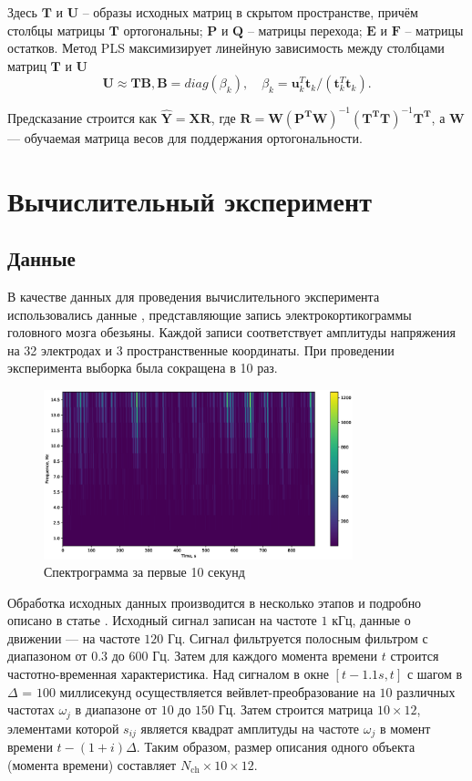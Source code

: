 \documentclass[12pt, twoside]{article}
\begin{document}
Здесь $\mathbf{T}$ и $\mathbf{U}$ – образы исходных матриц в скрытом пространстве, причём столбцы матрицы
$\mathbf{T}$ ортогональны; $\mathbf{P}$ и $\mathbf{Q}$ – матрицы перехода; $\mathbf{E}$ и $\mathbf{F}$ – матрицы остатков. Метод PLS
максимизирует линейную зависимость между столбцами матриц $\mathbf{T}$ и $\mathbf{U}$
\[\mathbf{U} \approx \mathbf{TB}, \mathbf{B} = diag(\beta_k), \quad \beta_k = \mathbf{u}^T_k 
\mathbf{t}_k/(\mathbf{t}^T_k\mathbf{
t}_k).
\]

Предсказание строится как $\hat{\mathbf{Y}} = \mathbf{XR}$, где $\mathbf{R} = \mathbf{W(P^TW)}^{-1}\mathbf{(T^TT)}^{-1}\mathbf{T^T}$, а $\mathbf{W}$ --- обучаемая матрица весов для поддержания ортогональности.
\section{Вычислительный эксперимент}
\subsection{Данные}
В качестве данных для проведения вычислительного эксперимента использовались данные \cite{chao2010long}, представляющие запись электрокортикограммы головного мозга обезьяны. Каждой записи соответствует амплитуды напряжения на 32 электродах и 3 пространственные координаты.
При проведении эксперимента выборка была сокращена в 10 раз.

\begin{figure}[h!]
	\centering
	\includegraphics[width=0.8\textwidth]{../figs/spectrogram.eps}
	\caption{Спектрограмма за первые 10 секунд}
\end{figure}
Обработка исходных данных производится в несколько этапов и подробно описано в статье \cite{zhao2010ecog}. Исходный сигнал записан на частоте $1$ кГц, данные о движении — на частоте $120 $ Гц. Сигнал фильтруется полосным фильтром с диапазоном от $0.3$ до $600 $ Гц. Затем для каждого момента времени $t$ строится частотно-временная
характеристика. Над сигналом в окне $[t - 1.1s, t]$ с шагом в $\Delta$ = $100$ миллисекунд осуществляется вейвлет-преобразование на $10$ различных частотах $\omega_j$ в диапазоне от $10$ до $150$ Гц. Затем строится матрица \mbox{$10 \times 12$}, элементами которой $s_{ij}$ является квадрат амплитуды на частоте $\omega_j$ в момент времени \mbox{$t - (1 + i)\Delta$}. Таким образом, размер описания одного объекта (момента времени) составляет $N_\text{ch} \times 10 \times 12$.
\end{document}
